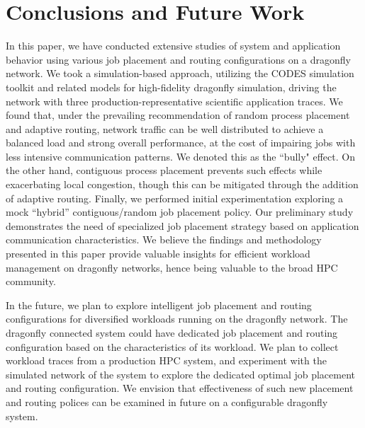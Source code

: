 \section{Conclusions and Future Work}
\label{sec:conclusion}

In this paper, we have conducted extensive studies of system and application behavior using various job placement and routing configurations on a dragonfly network. We took a simulation-based approach, utilizing the CODES simulation toolkit and related models for high-fidelity dragonfly simulation, driving the network with three production-representative scientific application traces. We found that, under the prevailing recommendation of random process placement and adaptive routing, 
network traffic can be well distributed to achieve a balanced load and strong overall performance, 
at the cost of impairing jobs with less intensive communication patterns. We denoted this as the ``bully" effect. On the other hand, contiguous process placement prevents such effects while exacerbating local congestion, though this can be mitigated through the addition of adaptive routing. 
Finally, we performed initial experimentation exploring a mock ``hybrid'' contiguous/random job placement policy. 
Our preliminary study demonstrates the need of specialized job placement strategy based on application communication characteristics. 
We believe the findings and methodology presented in this paper provide valuable insights for efficient workload management on dragonfly networks, hence being valuable to the broad HPC community.


In the future, we plan to explore intelligent job placement and routing configurations for diversified workloads running on the dragonfly network. The dragonfly connected system could have dedicated job placement and routing configuration based on the characteristics of its workload. We plan to collect workload traces from a production HPC system, and experiment with the simulated network of the system to explore the dedicated optimal job placement and routing configuration. We envision that effectiveness of such new placement and routing polices can be examined in future on a configurable dragonfly system. 

